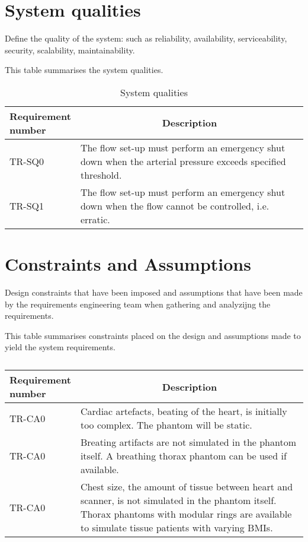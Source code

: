 \section{System qualities}
Define the quality of the system: such as reliability, availability, serviceability, security, scalability, maintainability.
\begin{table} [H]
\caption{System qualities}
\label{tab:sysqual}
This table summarises the system qualities.
\begin{tabular}{l|p{120mm}|}
	\makecell[l]{\textbf{Requirement} \\ \textbf{number}} & \multicolumn{1}{c}{\textbf{Description}}\\
	\hline
	TR-SQ0 & The flow set-up must perform an emergency shut down when the arterial pressure exceeds specified threshold. \\ 
	TR-SQ1 & The flow set-up must perform an emergency shut down when the flow cannot be controlled, i.e. erratic. \\
	\cline{2-2}
\end{tabular}
\end{table}

\section{Constraints and Assumptions}
Design constraints that have been imposed and assumptions that have been made by the requirements engineering team when gathering and analyzijng the requirements.

\begin{table}[H]
\caption{}
\label{tab:constassump}
This table summarises constraints placed on the design and assumptions made to yield the system requirements.
\begin{tabular}{l|p{120mm}|}
	\makecell[l]{\textbf{Requirement} \\ \textbf{number}} & \multicolumn{1}{c}{\textbf{Description}}\\
	\hline
	TR-CA0 &  Cardiac artefacts, beating of the heart, is initially too complex. The phantom will be static. \\
	TR-CA0 & Breating artifacts are not simulated in the phantom itself. A breathing thorax phantom can be used if available. \\
	TR-CA0 & Chest size, the amount of tissue between heart and scanner, is not simulated in the phantom itself. Thorax phantoms with modular rings are available to simulate tissue patients with varying BMIs. \\
	\cline{2-2}
\end{tabular}
\end{table}
